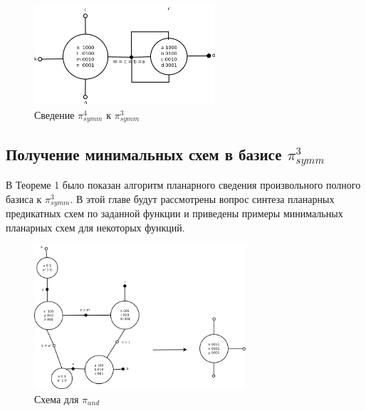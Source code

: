 \documentclass[12pt]{article}
\begin{document}
\begin{figure}[htb]
 \centering
\includegraphics[width=0.6\textwidth]{4to3.png}
\caption{Сведение $\pi_{symm}^4$ к $\pi_{symm}^3$ }
\label{fig:4to3}
\end{figure}



\clearpage
\subsection{Получение минимальных схем в базисе $\pi_{symm}^3$}
В Теореме 1 было показан алгоритм планарного сведения произвольного полного базиса к $\pi_{symm}^3$. 
В этой главе будут рассмотрены вопрос синтеза планарных предикатных схем по заданной функции и 
приведены примеры минимальных планарных схем для некоторых функций.


\begin{figure}[htb]
\centering
\includegraphics[width=0.7\textwidth]{min_and.png}
\caption{Схема для $\pi_{and}$}
\label{fig:and}
\end{figure}
\end{document}
